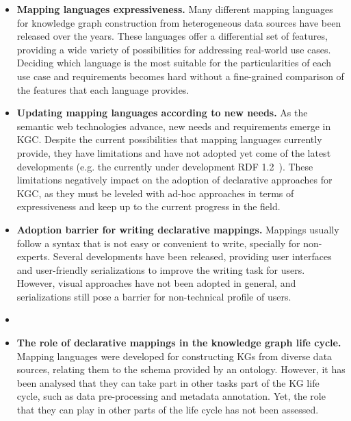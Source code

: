 \begin{itemize}
    \item \textbf{Mapping languages expressiveness.} Many different mapping languages for knowledge graph construction from heterogeneous data sources have been released over the years. These languages offer a differential set of features, providing a wide variety of possibilities for addressing real-world use cases. Deciding which language is the most suitable for the particularities of each use case and requirements becomes hard without a fine-grained comparison of the features that each language provides. 
    
    \item \textbf{Updating mapping languages according to new needs.} As the semantic web technologies advance, new needs and requirements emerge in KGC. Despite the current possibilities that mapping languages currently provide, they have limitations and have not adopted yet come of the latest developments (e.g. the currently under development RDF 1.2~\parencite{hartig2023rdf}). These limitations negatively impact on the adoption of declarative approaches for KGC, as they must be leveled with ad-hoc approaches in terms of expressiveness and keep up to the current progress in the field.
    
    \item \textbf{Adoption barrier for writing declarative mappings.} Mappings usually follow a syntax that is not easy or convenient to write, specially for non-experts. Several developments have been released, providing user interfaces and user-friendly serializations to improve the writing task for users. However, visual approaches have not been adopted in general, and serializations still pose a barrier for non-technical profile of users. 

    \item {}
    
    \item \textbf{The role of declarative mappings in the knowledge graph life cycle.} Mapping languages were developed for constructing KGs from diverse data sources, relating them to the schema provided by an ontology. However, it has been analysed that they can take part in other tasks part of the KG life cycle, such as data pre-processing and metadata annotation. Yet, the role that they can play in other parts of the life cycle has not been assessed. 
\end{itemize}
